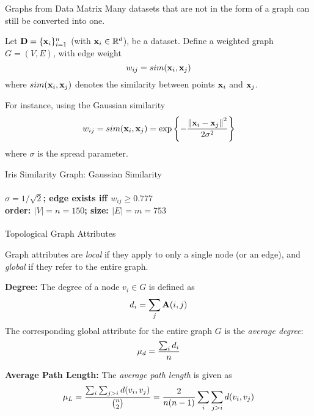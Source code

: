 \begin{frame}{Graphs from Data Matrix}
Many datasets that are not in the form of a graph can
still be converted into one. 

\medskip
Let
$\mathbf{D} = \{ \mathbf{x}_i \}_{i=1}^n$ (with $\mathbf{x}_i \in {\mathord{\mathbb R}}^d$), be a
dataset.
Def\/{i}ne a weighted graph $G=(V,E)$,
with edge weight
$$w_{ij} = sim(\mathbf{x}_i, \mathbf{x}_{j})$$
where $sim(\mathbf{x}_i, \mathbf{x}_{j})$ denotes the
similarity between points $\mathbf{x}_i$ and $\mathbf{x}_{j}$.

\medskip
For instance, using the Gaussian
similarity 
\begin{align*} 
  w_{ij} = sim(\mathbf{x}_i, \mathbf{x}_{j}) =
    \exp \left\{- {\left\lVert\mathbf{x}_i - \mathbf{x}_{j}\right\rVert^2 \over 2\sigma^2} \right\}
\end{align*}
where $\sigma$ is the spread parameter.
\end{frame}


\begin{frame}{Iris Similarity Graph: Gaussian Similarity}
  \framesubtitle{$\sigma=1/\sqrt{2}$; edge exists iff $w_{ij} \ge
  0.777$\\
  order: $|V|=n=150$; size: $|E|=m=753$}
\centering
\end{frame}

\begin{frame}{Topological Graph Attributes}

Graph attributes
are {\em local} if they apply to only a single node
(or an edge), and
{\em global} if they refer to the entire graph.

\medskip
{\bf Degree:}
The degree of a node $v_i\in G$ is defined as
\begin{align*}
d_i = \sum_{j} \mathbf{A}(i,j)
\end{align*}
The corresponding global attribute for the entire graph $G$ 
is the {\em average degree}:
\begin{align*}
\mu_d = {\sum_i d_i \over n}
\end{align*}

\medskip
{\bf Average Path Length:}
The {\em average path length}
is given as
\begin{align*}
    \mu_L =  {\sum_i \sum_{j>i} d(v_i, v_{j}) \over {n \choose 2}}
    = {2 \over n(n-1)} \sum_i \sum_{j>i} d(v_i, v_{j})
\end{align*}
\end{frame}


